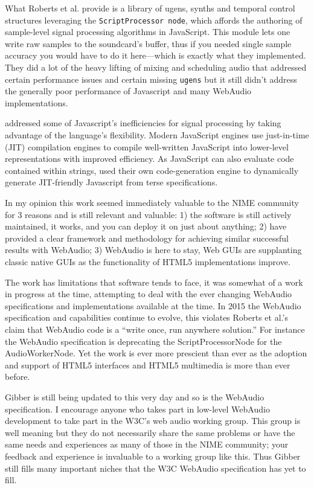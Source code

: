 What Roberts et al. provide is a library of ugens, synths and temporal control structures leveraging the \texttt{ScriptProcessor node}, which affords the authoring of sample-level signal processing algorithms in JavaScript. This module lets one write raw samples to the soundcard's buffer, thus if you needed single sample accuracy you would have to do it here---which is exactly what they implemented. They did a lot of the heavy lifting of mixing and scheduling audio that addressed certain performance issues and certain missing \texttt{ugens} but it still didn't address the generally poor performance of Javascript and many WebAudio implementations.

 \cite{Roberts:2013} addressed some of Javascript's inefficiencies for signal processing by taking advantage of the language's flexibility. Modern JavaScript engines use just-in-time (JIT) compilation engines to compile well-written JavaScript into lower-level representations with improved efficiency. As JavaScript can also evaluate code contained within strings,  \cite{Roberts:2013} used their own code-generation engine to dynamically generate JIT-friendly Javascript from terse specifications.

In my opinion this work seemed immediately valuable to the NIME community for 3 reasons and is still relevant and valuable: 1) the software is still actively maintained, it works, and you can deploy it on just about anything; 2)  \cite{Roberts:2013} have provided a clear framework and methodology for achieving similar successful results with WebAudio; 3) WebAudio is here to stay, Web GUIs are supplanting classic native GUIs as the functionality of HTML5 implementations improve.

The work has limitations that software tends to face, it was somewhat of a work in progress at the time, attempting to deal with the ever changing WebAudio specifications and implementations available at the time. In 2015 the WebAudio specification and capabilities continue to evolve, this violates Roberts et al.'s claim that WebAudio code is a ``write once, run anywhere solution.'' For instance the WebAudio specification is deprecating the ScriptProcessorNode for the AudioWorkerNode. Yet the work is ever more prescient than ever as the adoption and support of HTML5 interfaces and HTML5 multimedia is more than ever before.

Gibber is still being updated to this very day and so is the WebAudio specification. I encourage anyone who takes part in low-level WebAudio development to take part in the W3C's web audio working group. This group is well meaning but they do not necessarily share the same problems or have the same needs and experiences as many of those in the NIME community; your feedback and experience is invaluable to a working group like this. Thus Gibber still fills many important niches that the W3C WebAudio specification has yet to fill.

